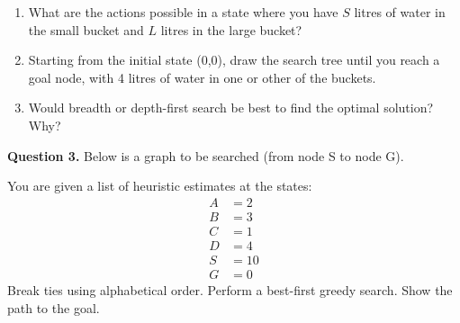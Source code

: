 \documentclass[a4paper,12pt]{article}
\begin{document}
\begin{enumerate}
    \item What are the actions possible in a state where you have $S$ litres of water in the small bucket and $L$ litres in the large bucket?
    \item Starting from the initial state (0,0), draw the search tree until you reach a goal node, with 4 litres of water in one or other of the buckets.
    \item Would breadth or depth-first search be best to find the optimal solution? Why?
\end{enumerate}

\noindent \textbf{Question 3.} Below is a graph to be searched (from node S to node G).
\begin{center}
\end{center}




You are given a list of heuristic estimates at the states:
\begin{align*}
    A &= 2 \\
    B &= 3 \\
    C &= 1 \\
    D &= 4 \\
    S &= 10 \\
    G &= 0
\end{align*}
Break ties using alphabetical order. Perform a best-first greedy search. Show the path to the goal.\\[1 cm]
\end{document}
